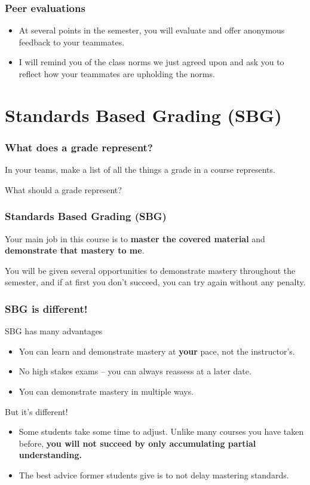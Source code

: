 \documentclass[aspectration=1610]{beamer}
\begin{document}
\begin{frame}\frametitle{Peer evaluations}


\begin{itemize}
\item At several points in the semester, you will evaluate and offer anonymous feedback to your teammates.
\item I will remind you of the class norms we just agreed upon and ask you to reflect how your teammates are upholding the norms.
\end{itemize}
\end{frame}

\section{Standards Based Grading (SBG)}
\begin{frame}\frametitle{What does a grade represent?}

In your teams, make a list of all the things a grade in a course represents.
\vfill

\pause
What should a grade represent?
\vfill
\end{frame}



\begin{frame}\frametitle{Standards Based Grading (SBG)}
Your main job in this course is to \textbf{master the covered material}
and \textbf{demonstrate that mastery to me}.

\vspace{0.2in}
\pause

You will be given several opportunities to demonstrate mastery throughout
the semester, and if
at first you don't succeed, you can try again without any penalty.
\end{frame}

\begin{frame}\frametitle{SBG is different!}
SBG has many advantages
\begin{itemize}
\item You can learn and demonstrate mastery at \textbf{your} pace, not the instructor's.
\item No high stakes exams -- you can always reassess at a later date.
\item You can demonstrate mastery in multiple ways.
\end{itemize}
\vfill
But it's different!
\begin{itemize}
\item Some students take some time to adjust.  Unlike many courses you have taken before, \textbf{you will not succeed by only accumulating partial understanding.}
\item The best advice former students give is to not delay mastering standards.
\end{itemize}
\end{frame}
\end{document}

